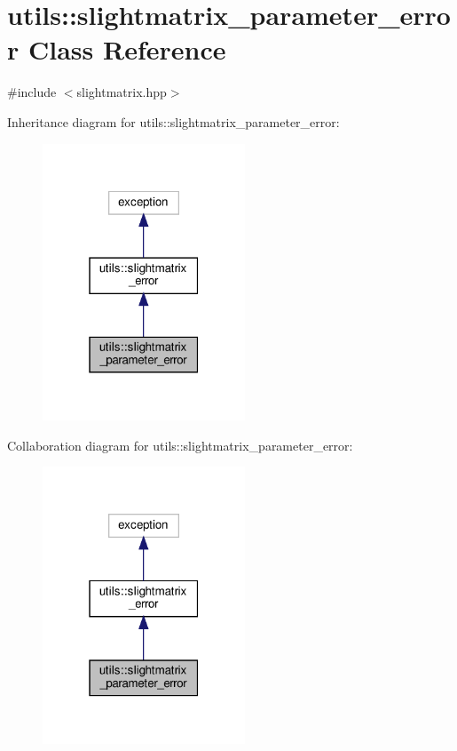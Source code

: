\hypertarget{classutils_1_1slightmatrix__parameter__error}{}\section{utils\+:\+:slightmatrix\+\_\+parameter\+\_\+error Class Reference}
\label{classutils_1_1slightmatrix__parameter__error}


{\ttfamily \#include $<$slightmatrix.\+hpp$>$}



Inheritance diagram for utils\+:\+:slightmatrix\+\_\+parameter\+\_\+error\+:\nopagebreak
\begin{figure}[H]
\begin{center}
\leavevmode
\includegraphics[width=171pt]{classutils_1_1slightmatrix__parameter__error__inherit__graph}
\end{center}
\end{figure}


Collaboration diagram for utils\+:\+:slightmatrix\+\_\+parameter\+\_\+error\+:\nopagebreak
\begin{figure}[H]
\begin{center}
\leavevmode
\includegraphics[width=171pt]{classutils_1_1slightmatrix__parameter__error__coll__graph}
\end{center}
\end{figure}


